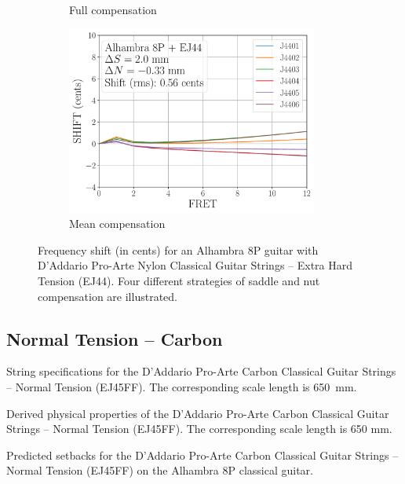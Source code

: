 \begin{figure}
\begin{subfigure}[b]{0.45\textwidth}
   \caption{Full compensation}
   \label{fig:shift_alhambra8p_ej44_full}
  \end{subfigure}
  \hspace{0.25in}
  \begin{subfigure}[b]{0.45\textwidth}
   \centering
   \includegraphics[width=3.25in]{../figures/shift_alhambra8p_ej44_mean}
   \caption{Mean compensation}
   \label{fig:shift_alhambra8p_ej44_mean}
  \end{subfigure}
  \caption{\label{fig:compensation_alhambra8p_ej44} Frequency shift (in cents) for an Alhambra 8P guitar with D'Addario Pro-Arte Nylon Classical Guitar Strings -- Extra Hard Tension (EJ44). Four different strategies of saddle and nut compensation are illustrated.}
 \end{figure}

 \newpage
 \subsection{Normal Tension -- Carbon}
 
 \begin{table}[htbp]
   \centering
   \caption{\label{tbl:ej45ff_mks} String specifications for the D'Addario Pro-Arte Carbon Classical Guitar Strings -- Normal Tension (EJ45FF). The corresponding scale length is 650~mm.}
   
 \end{table}%
 
 \begin{table}[htbp]
   \centering
   \caption{\label{tbl:ej45ff_props} Derived physical properties of the D'Addario Pro-Arte Carbon Classical Guitar Strings -- Normal Tension (EJ45FF). The corresponding scale length is 650 mm.}
   
 \end{table}%
 
 \begin{table}[htbp]
   \centering
   \caption{\label{tbl:ej45ff_setbacks} Predicted setbacks for the D'Addario Pro-Arte Carbon Classical Guitar Strings -- Normal Tension (EJ45FF) on the Alhambra 8P classical guitar.}
   
 \end{table}%
 
